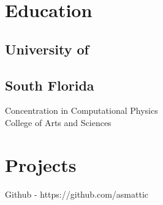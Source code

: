 \documentclass[letterpaper]{deedy-resume} %
\begin{document}
\begin{minipage}[t]{0.33\textwidth} %


\section{Education} 

\subsection{University of}
\subsection{South Florida}

Concentration in Computational Physics \\
College of Arts and Sciences \\

\sectionspace %



\section{Projects}
\textbullet{} Github - https://github.com/asmattic \\


\end{minipage}
\end{document}

